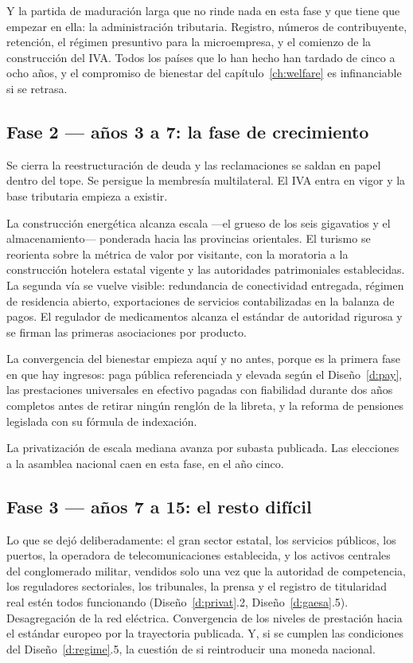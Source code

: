 Y la partida de maduración larga que no rinde nada en esta fase y que tiene que empezar en ella: la
administración tributaria. Registro, números de contribuyente, retención, el régimen presuntivo para
la microempresa, y el comienzo de la construcción del IVA. Todos los países que lo han hecho han
tardado de cinco a ocho años, y el compromiso de bienestar del capítulo~\ref{ch:welfare} es
infinanciable si se retrasa.

\subsection*{Fase 2 --- años 3 a 7: la fase de crecimiento}

Se cierra la reestructuración de deuda y las reclamaciones se saldan en papel dentro del tope. Se
persigue la membresía multilateral. El IVA entra en vigor y la base tributaria empieza a existir.

La construcción energética alcanza escala ---el grueso de los seis gigavatios y el
almacenamiento--- ponderada hacia las provincias orientales. El turismo se reorienta sobre la
métrica de valor por visitante, con la moratoria a la construcción hotelera estatal vigente y las
autoridades patrimoniales establecidas. La segunda vía se vuelve visible: redundancia de
conectividad entregada, régimen de residencia abierto, exportaciones de servicios contabilizadas en
la balanza de pagos. El regulador de medicamentos alcanza el estándar de autoridad rigurosa y se
firman las primeras asociaciones por producto.

La convergencia del bienestar empieza aquí y no antes, porque es la primera fase en que hay
ingresos: paga pública referenciada y elevada según el Diseño~\ref{d:pay}, las prestaciones
universales en efectivo pagadas con fiabilidad durante dos años completos antes de retirar ningún
renglón de la libreta, y la reforma de pensiones legislada con su fórmula de indexación.

La privatización de escala mediana avanza por subasta publicada. Las elecciones a la asamblea
nacional caen en esta fase, en el año cinco.

\subsection*{Fase 3 --- años 7 a 15: el resto difícil}

Lo que se dejó deliberadamente: el gran sector estatal, los servicios públicos, los puertos, la
operadora de telecomunicaciones establecida, y los activos centrales del conglomerado militar,
vendidos solo una vez que la autoridad de competencia, los reguladores sectoriales, los tribunales,
la prensa y el registro de titularidad real estén todos funcionando (Diseño~\ref{d:privat}.2,
Diseño~\ref{d:gaesa}.5). Desagregación de la red eléctrica. Convergencia de los niveles de
prestación hacia el estándar europeo por la trayectoria publicada. Y, si se cumplen las condiciones
del Diseño~\ref{d:regime}.5, la cuestión de si reintroducir una moneda nacional.

